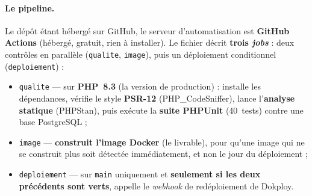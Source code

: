 \paragraph{Le pipeline.} Le dépôt étant hébergé sur GitHub, le serveur d'automatisation est
\textbf{GitHub Actions} (hébergé, gratuit, rien à installer). Le fichier
 décrit \textbf{trois \emph{jobs}} : deux contrôles en parallèle
(\texttt{qualite}, \texttt{image}), puis un déploiement conditionnel (\texttt{deploiement}) :
\begin{itemize}
  \item \texttt{qualite} --- sur \textbf{PHP~8.3} (la version de production) : installe les
        dépendances, vérifie le style \textbf{PSR-12} (PHP\_CodeSniffer), lance l'\textbf{analyse
        statique} (PHPStan), puis exécute la \textbf{suite PHPUnit} (40~tests) contre une base
        PostgreSQL ;
  \item \texttt{image} --- \textbf{construit l'image Docker} (le livrable), pour qu'une image qui
        ne se construit plus soit détectée immédiatement, et non le jour du déploiement ;
  \item \texttt{deploiement} --- sur \texttt{main} uniquement et \textbf{seulement si les deux
        précédents sont verts}, appelle le \emph{webhook} de redéploiement de Dokploy.
\end{itemize}

